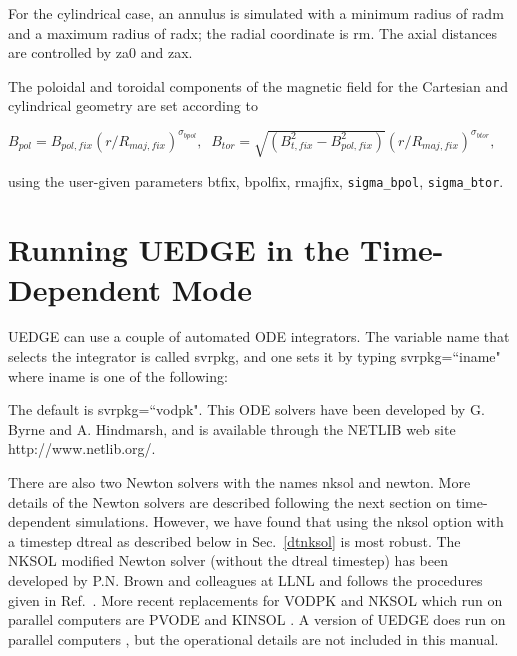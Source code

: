 \documentclass [12pt]{article}
\def\hsa{\hskip.4truein}
\def\hsp6{\hskip.6truein}
\begin{document}
For the cylindrical case, an annulus is simulated with a minimum radius of
{\sf radm} and a maximum radius of {\sf radx}; the radial coordinate is {\sf
  rm}.  The axial distances are controlled by {\sf za0} and {\sf zax}.  

The poloidal and toroidal components of the magnetic field for the
Cartesian and cylindrical geometry are set according to

$ 
B_{pol} = B_{pol,fix} (r/R_{maj,fix})^{\sigma_{bpol}}, \;\;
B_{tor} = \sqrt{(B_{t,fix}^2-B_{pol,fix}^2)} (r/R_{maj,fix})^{\sigma_{btor}}, 
$

\noindent
using the user-given parameters {\sf btfix}, {\sf bpolfix}, {\sf
  rmajfix}, {\sf \verb|sigma_bpol|}, {\sf \verb|sigma_btor|}.



\section{Running {\sf UEDGE} in the Time-Dependent Mode}

{\sf UEDGE} can use a couple of automated ODE integrators. The variable name
that selects the integrator is called svrpkg, and one sets it by typing {\sf
  svrpkg=``iname"} where iname is one of the following: {\sf
{}
}

The default is {\sf svrpkg=``vodpk"}. This ODE solvers have been developed by
G. Byrne \cite{byrne92} and A. Hindmarsh, and is available through the {\sf
NETLIB} web site {\sf http://www.netlib.org/}.

There are also two Newton solvers with the names {\sf nksol} and {\sf newton}.
More details of the Newton solvers are described following the next section on
time-dependent simulations.  However, we have found that using the {\sf nksol}
option with a timestep {\sf dtreal} as described below in Sec.~\ref{dtnksol}
is most robust.  The {\sf NKSOL} modified Newton solver (without the {\sf
dtreal} timestep) has been developed by P.N. Brown and colleagues at LLNL and
follows the procedures given in Ref.~.  More recent
replacements for {\sf VODPK} and {\sf NKSOL} which run on parallel computers
are {\sf PVODE} and {\sf KINSOL} \cite{hindm98}.  A version of {\sf UEDGE}
does run on parallel computers \cite{rog_pu}, but the operational details are
not included in this manual.
\end{document}
